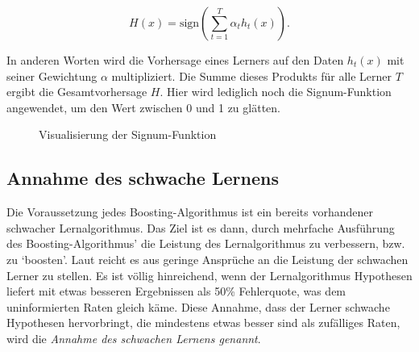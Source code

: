 \begin{equation}
    H(x) = \text{sign}\left(\sum_{t=1}^{T} \alpha_t h_t(x)\right).
\end{equation}
    
In anderen Worten wird die Vorhersage eines Lerners auf den Daten \( h_t(x) \) mit seiner Gewichtung \( \alpha \) multipliziert. Die Summe dieses Produkts für alle Lerner \( T \) ergibt die Gesamtvorhersage \( H \). Hier wird lediglich noch die Signum-Funktion angewendet, um den Wert zwischen 0 und 1 zu glätten.

\begin{figure}[h]
    \centering
    \caption{Visualisierung der Signum-Funktion}
    \label{fig:signum_function}
\end{figure}

\subsection{Annahme des schwache Lernens}
Die Voraussetzung jedes Boosting-Algorithmus ist ein bereits vorhandener schwacher Lernalgorithmus. Das Ziel ist es dann, durch mehrfache Ausführung des Boosting-Algorithmus' die Leistung des Lernalgorithmus zu verbessern, bzw. zu `boosten'. Laut \textcite[S. S.~4]{SchapireFreund2012} reicht es aus geringe Ansprüche an die Leistung der schwachen Lerner zu stellen. Es ist völlig hinreichend, wenn der Lernalgorithmus Hypothesen liefert mit etwas besseren Ergebnissen als 50\% Fehlerquote, was dem uninformierten Raten gleich käme.
\newline
Diese Annahme, dass der Lerner schwache Hypothesen hervorbringt, die mindestens etwas besser sind als zufälliges Raten, wird die \textit{Annahme des schwachen Lernens genannt}.